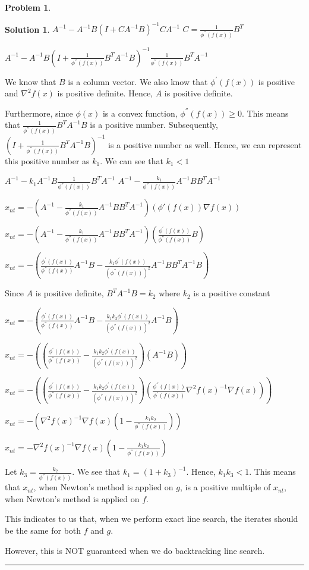 \documentclass{article}
\theoremstyle{definition}
\newtheorem{problem}{Problem}
\def\fline{\rule{0.75\linewidth}{0.5pt}}
\newcommand{\finishline}{\begin{center}\fline\end{center}}
\newtheorem*{solution*}{Solution}
\newenvironment{solution}{\begin{solution*}}{{\finishline} \end{solution*}}
\begin{document}
\begin{problem}
\begin{solution}
$A^{-1} - A^{-1}B (I + CA^{-1}B)^{-1} CA^{-1}$ \newline 
$C = \frac{1}{\phi^{''}(f(x))} B^T$ \newline 


$A^{-1} - A^{-1}B (I + \frac{1}{\phi^{''}(f(x))} B^TA^{-1}B)^{-1} \frac{1}{\phi^{''}(f(x))} B^TA^{-1}$ \newline 

We know that $B$ is a column vector. We also know that $\phi^{'}(f(x))$ is positive and $\nabla^2f(x)$ is positive definite. Hence, $A$ is positive definite.

Furthermore, since $\phi(x)$ is a convex function, $\phi^{''}(f(x)) \geq 0$. This means that $\frac{1}{\phi^{''}(f(x))} B^TA^{-1}B$ is a positive number. Subsequently, $(I + \frac{1}{\phi^{''}(f(x))} B^TA^{-1}B)^{-1}$ is a positive number as well. Hence, we can represent this positive number as $k_1$. We can see that $k_1 < 1$

$A^{-1} - k_1 A^{-1}B \frac{1}{\phi^{''}(f(x))} B^TA^{-1}$ \newline 
$A^{-1} - \frac{k_1}{\phi^{''}(f(x))} A^{-1}B  B^TA^{-1}$ \newline 

$x_{nt} = -(A^{-1} - \frac{k_1}{\phi^{''}(f(x))} A^{-1}B  B^TA^{-1}) ( \phi'(f(x)) \nabla f(x))$

$x_{nt} = -(A^{-1} - \frac{k_1}{\phi^{''}(f(x))} A^{-1}B  B^TA^{-1}) ( \frac{\phi^{'}(f(x))}{\phi^{''}(f(x))} B)$

$x_{nt} = -(\frac{\phi^{'}(f(x))}{\phi^{''}(f(x))} A^{-1}B - \frac{k_1 \phi^{'}(f(x))}{(\phi^{''}(f(x)))^2} A^{-1}B  B^TA^{-1}B)$

Since $A$ is positive definite, $B^TA^{-1}B = k_2$ where $k_2$ is a positive constant

$x_{nt} = -(\frac{\phi^{'}(f(x))}{\phi^{''}(f(x))} A^{-1}B - \frac{k_1 k_2 \phi^{'}(f(x))}{(\phi^{''}(f(x)))^2} A^{-1}B)$

$x_{nt} = -( (\frac{\phi^{'}(f(x))}{\phi^{''}(f(x))} - \frac{k_1 k_2 \phi^{'}(f(x))}{(\phi^{''}(f(x)))^2}) (A^{-1}B))$

$x_{nt} = -((\frac{\phi^{'}(f(x))}{\phi^{''}(f(x))} - \frac{k_1 k_2 \phi^{'}(f(x))}{(\phi^{''}(f(x)))^2}) (\frac{\phi^{''}(f(x))}{\phi^{'}(f(x))} \nabla^2f(x)^{-1} \nabla f(x)))$


$x_{nt} = -(\nabla^2f(x)^{-1} \nabla f(x) ( 1 - \frac{k_1 k_2}{\phi^{''}(f(x))}))$

$x_{nt} = -\nabla^2f(x)^{-1} \nabla f(x) (1 - \frac{k_1 k_2}{\phi^{''}(f(x))})$

Let $k_3 = \frac{k_2}{\phi^{''}(f(x))}$. We see that $k_1 = (1 + k_3)^{-1}$. Hence, $k_1k_3 < 1$. This means that $x_{nt}$, when Newton's method is applied on $g$, is a positive multiple of $x_{nt}$, when Newton's method is applied on $f$.

This indicates to us that, when we perform exact line search, the iterates should be the same for both $f$ and $g$. 

However, this is NOT guaranteed when we do backtracking line search. 


\end{solution}
\end{problem}
\end{document}
